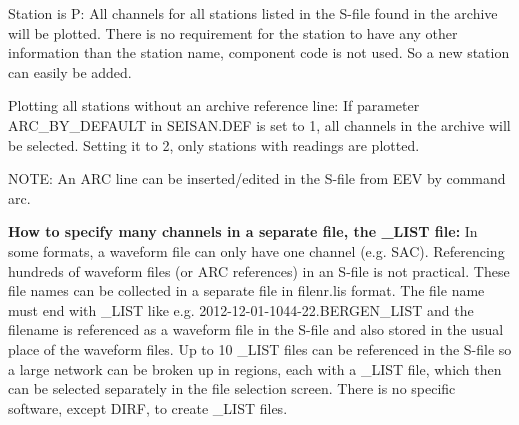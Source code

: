 Station is P: All channels for all stations listed in the S-file found in the archive will be plotted. There is no requirement for the station to have any other information than the station name, component code is not used. So a new station can easily be added.

Plotting all stations without an archive reference line: If parameter ARC\_BY\_DEFAULT in SEISAN.DEF is set to 1, all channels in the archive will be selected. Setting it to 2, only stations with readings are plotted.

NOTE: An ARC line can be inserted/edited in the S-file from EEV by  command arc.


\textbf{How to specify many channels in a separate file, the \_LIST file:} In some formats, a waveform file can only have one channel (e.g. SAC). Referencing hundreds of waveform files (or ARC references) in an S-file is not practical. These file names can be collected in a separate file in filenr.lis format. The file name must end with \_LIST like e.g. 2012-12-01-1044-22.BERGEN\_LIST and the filename is referenced as a waveform file in the S-file and also stored in the usual place of the waveform files. Up to 10 \_LIST files can be referenced in the S-file so a large network can be broken up in regions, each with a \_LIST file, which then can be selected separately in the file selection screen. There is no specific software, except DIRF, to create \_LIST files.

